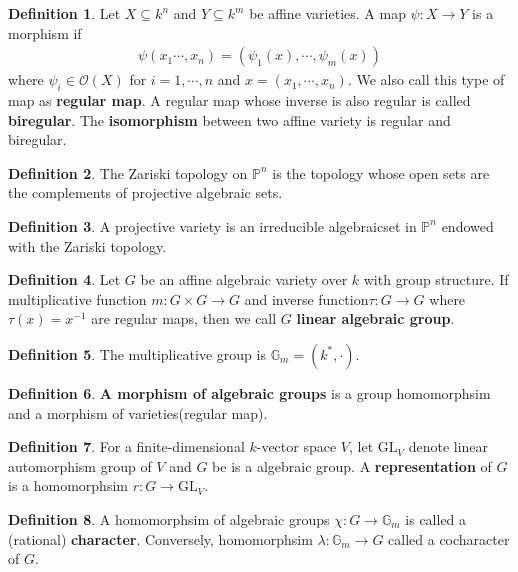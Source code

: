\documentclass[10pt,UTF8]{article}
\theoremstyle{definition}
\newcommand{\gl}{\text{GL}}
\newtheorem{definition}{Definition}[section]
\begin{document}
\begin{definition}
  Let $X\subseteq k^n$ and $Y\subseteq k^m$ be affine varieties. A map $\psi:X\to Y$ is a morphism if
  \begin{align*}
    \psi(x_1\cdots,x_n) = (\psi_1(x),\cdots,\psi_m(x))
  \end{align*}
  where $\psi_i \in \mathcal{O}(X)$ for $i=1,\cdots,n$ and $x=(x_1,\cdots,x_n)$. We also call this type of map as \textbf{regular map}.
  A regular map whose inverse is also regular is called \textbf{biregular}. The \textbf{isomorphism} between two affine variety is regular and biregular.
\end{definition}


\begin{definition}
  The Zariski topology on $\mathbb{P}^n$ is the topology whose open sets are the complements of 
  projective algebraic sets.
\end{definition}

\begin{definition}
  A projective variety is an irreducible algebraicset in $\mathbb{P}^n$ endowed with the Zariski topology. 
\end{definition}



\begin{definition}
  Let $G$ be an affine algebraic variety over $k$ with group structure. If multiplicative function $m:G\times G\to G$ and inverse function$\tau:G\to G $ where $\tau(x)=x^{-1}$ are regular maps, then we call
  $G$ \textbf{linear algebraic group}.
\end{definition}
\begin{definition}
  The multiplicative group is $\mathbb{G}_m=(k^*,\cdot)$.
\end{definition}
\begin{definition}
  \textbf{A morphism of algebraic groups} is a group homomorphsim and a morphism of varieties(regular map).
\end{definition}

\begin{definition}
  For a finite-dimensional $k$-vector space $V$, let $\gl_V$ denote linear automorphism group of $V$ and $G$ be is a algebraic group.
  A \textbf{representation} of $G$ is a homomorphsim $r:G\to \gl_V$.
\end{definition}

\begin{definition}
  A homomorphsim of algebraic groups $\chi:G\to \mathbb{G}_m$ is called a (rational) \textbf{character}. Conversely, homomorphsim $\lambda:\mathbb{G}_m\to G$ called a cocharacter of $G$.
\end{definition}
\end{document}
